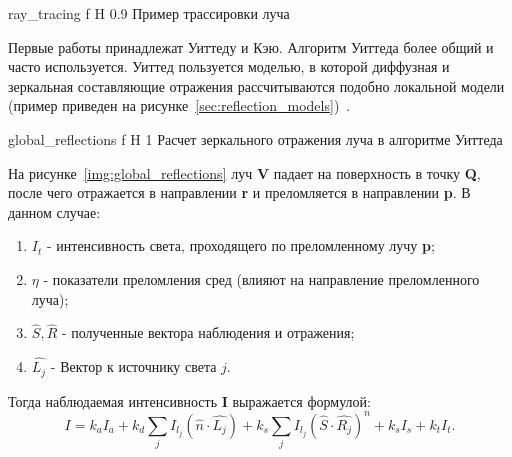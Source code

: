 {ray_tracing} %
{f} %
{H} %
{0.9\textwidth} %
{Пример трассировки луча} %






Первые работы принадлежат Уиттеду и Кэю. Алгоритм Уиттеда более общий и часто используется.
Уиттед пользуется моделью, в которой диффузная и зеркальная составляющие отражения рассчитываются подобно локальной модели (пример приведен на рисунке~\ref{sec:reflection_models})~\cite{Rodgers}.



{global_reflections} %
{f} %
{H} %
{1\textwidth} %
{Расчет зеркального отражения луча в алгоритме Уиттеда} %


На рисунке~\ref{img:global_reflections} луч \textbf{V} падает на поверхность в точку \textbf{Q}, после чего отражается в направлении \textbf{r} и преломляется
в направлении \textbf{p}.
В данном случае:
\begin{enumerate}
	\item $I_t$ - интенсивность света, проходящего по преломленному лучу \textbf{p};
	\item $\eta$ - показатели преломления сред (влияют на направление преломленного луча);
	\item $\hat{S},\hat{R}$ - полученные вектора наблюдения и отражения;
	\item $\hat{L_j}$ - Вектор к источнику света $j$.

\end{enumerate}

Тогда наблюдаемая интенсивность \textbf{I} выражается формулой:
\begin{equation} 
	I = k_aI_a + k_d \sum_{j} I_{l_j}(\hat{n} \cdot \hat{L_j}) + k_s \sum_{j} I_{l_j}(\hat{S} \cdot \hat{R_j})^n + k_sI_s + k_tI_t.
	\label{eq:intensivity}
\end{equation}

